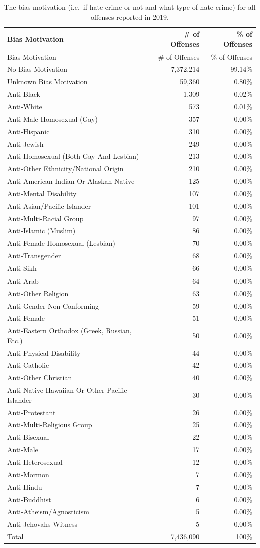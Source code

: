 \documentclass[
  12pt,
  openany]{book}
\begin{document}
\begin{longtable}[]{@{}lrr@{}}
\caption{\label{tab:offenseBiasMotivation}The bias motivation (i.e.~if hate crime or not and what type of hate crime) for all offenses reported in 2019.}\tabularnewline
\toprule
Bias Motivation & \# of Offenses & \% of Offenses\tabularnewline
\midrule
\endfirsthead
\toprule
Bias Motivation & \# of Offenses & \% of Offenses\tabularnewline
\midrule
\endhead
No Bias Motivation & 7,372,214 & 99.14\%\tabularnewline
Unknown Bias Motivation & 59,360 & 0.80\%\tabularnewline
Anti-Black & 1,309 & 0.02\%\tabularnewline
Anti-White & 573 & 0.01\%\tabularnewline
Anti-Male Homosexual (Gay) & 357 & 0.00\%\tabularnewline
Anti-Hispanic & 310 & 0.00\%\tabularnewline
Anti-Jewish & 249 & 0.00\%\tabularnewline
Anti-Homosexual (Both Gay And Lesbian) & 213 & 0.00\%\tabularnewline
Anti-Other Ethnicity/National Origin & 210 & 0.00\%\tabularnewline
Anti-American Indian Or Alaskan Native & 125 & 0.00\%\tabularnewline
Anti-Mental Disability & 107 & 0.00\%\tabularnewline
Anti-Asian/Pacific Islander & 101 & 0.00\%\tabularnewline
Anti-Multi-Racial Group & 97 & 0.00\%\tabularnewline
Anti-Islamic (Muslim) & 86 & 0.00\%\tabularnewline
Anti-Female Homosexual (Lesbian) & 70 & 0.00\%\tabularnewline
Anti-Transgender & 68 & 0.00\%\tabularnewline
Anti-Sikh & 66 & 0.00\%\tabularnewline
Anti-Arab & 64 & 0.00\%\tabularnewline
Anti-Other Religion & 63 & 0.00\%\tabularnewline
Anti-Gender Non-Conforming & 59 & 0.00\%\tabularnewline
Anti-Female & 51 & 0.00\%\tabularnewline
Anti-Eastern Orthodox (Greek, Russian, Etc.) & 50 & 0.00\%\tabularnewline
Anti-Physical Disability & 44 & 0.00\%\tabularnewline
Anti-Catholic & 42 & 0.00\%\tabularnewline
Anti-Other Christian & 40 & 0.00\%\tabularnewline
Anti-Native Hawaiian Or Other Pacific Islander & 30 & 0.00\%\tabularnewline
Anti-Protestant & 26 & 0.00\%\tabularnewline
Anti-Multi-Religious Group & 25 & 0.00\%\tabularnewline
Anti-Bisexual & 22 & 0.00\%\tabularnewline
Anti-Male & 17 & 0.00\%\tabularnewline
Anti-Heterosexual & 12 & 0.00\%\tabularnewline
Anti-Mormon & 7 & 0.00\%\tabularnewline
Anti-Hindu & 7 & 0.00\%\tabularnewline
Anti-Buddhist & 6 & 0.00\%\tabularnewline
Anti-Atheism/Agnosticism & 5 & 0.00\%\tabularnewline
Anti-Jehovahs Witness & 5 & 0.00\%\tabularnewline
Total & 7,436,090 & 100\%\tabularnewline
\bottomrule
\end{longtable}
\end{document}
